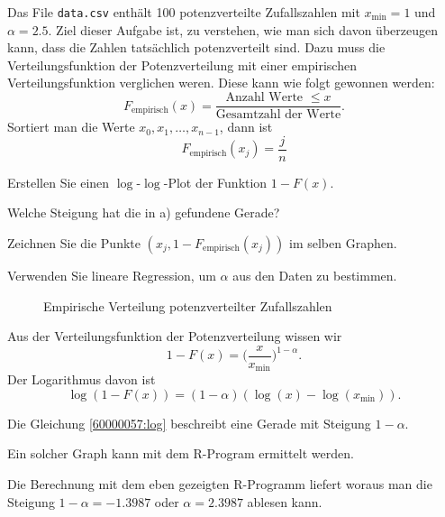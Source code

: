 Das File \texttt{data.csv} enthält 100 potenzverteilte Zufallszahlen mit
$x_{\text{min}}=1$ und $\alpha=2.5$.
Ziel dieser Aufgabe ist, zu verstehen, wie man sich davon überzeugen
kann, dass die Zahlen tatsächlich potenzverteilt sind.
Dazu muss die Verteilungsfunktion der Potenzverteilung mit einer
empirischen Verteilungsfunktion verglichen weren.
Diese kann wie folgt gewonnen werden:
\[
F_{\text{empirisch}}(x)
=
\frac{\text{Anzahl Werte $\le x$}}{\text{Gesamtzahl der Werte}}.
\]
Sortiert man die Werte $x_0,x_1,\dots,x_{n-1}$, dann ist 
\begin{equation}
F_{\text{empirisch}}(x_j) = \frac{j}{n}
\label{60000057}
\end{equation}
\begin{teilaufgaben}
\item 
Erstellen Sie einen $\log$-$\log$-Plot der Funktion $1-F(x)$.
\item
Welche Steigung hat die in a) gefundene Gerade?
\item
Zeichnen Sie die Punkte $(x_j,1-F_{\text{empirisch}}(x_j))$
im selben Graphen.
\item
Verwenden Sie lineare Regression, um $\alpha$ aus den Daten 
zu bestimmen.
\end{teilaufgaben}

\begin{loesung}
\begin{figure}
\centering
{}
\caption{Empirische Verteilung potenzverteilter Zufallszahlen
\label{60000057:graph}}
\end{figure}
\begin{teilaufgaben}
\item
Aus der Verteilungsfunktion der Potenzverteilung wissen wir
\[
1-F(x)
=
\biggl(\frac{x}{x_{\text{min}}} \biggr)^{1-\alpha}.
\]
Der Logarithmus davon ist
\begin{equation}
\log(1-F(x))=(1-\alpha)(\log(x) - \log(x_{\text{min}})).
\label{60000057:log}
\end{equation}
\item
Die Gleichung \eqref{60000057:log} beschreibt eine Gerade mit
Steigung $1-\alpha$.
\item
Ein solcher Graph kann mit dem R-Program
ermittelt werden.
\item
Die Berechnung mit dem eben gezeigten R-Programm liefert
woraus man die Steigung $1-\alpha=-1.3987$ oder $\alpha=2.3987$ 
ablesen kann.
\qedhere
\end{teilaufgaben}
\end{loesung}


